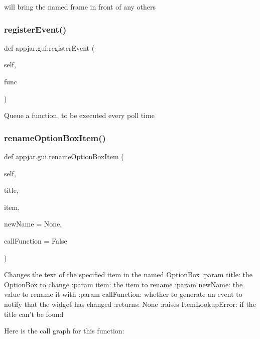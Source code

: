 \begin{DoxyVerb}
\begin{DoxyVerb}will bring the named frame in front of any others \end{DoxyVerb}
 \mbox{\label{classappjar_1_1gui_aaa7ebd8bcd4da761727153007b3b13f2}} 
\subsubsection{\texorpdfstring{register\+Event()}{registerEvent()}}
{\footnotesize\ttfamily def appjar.\+gui.\+register\+Event (\begin{DoxyParamCaption}\item[{}]{self,  }\item[{}]{func }\end{DoxyParamCaption})}

\begin{DoxyVerb}Queue a function, to be executed every poll time \end{DoxyVerb}
 \mbox{\label{classappjar_1_1gui_aa09c49e2dc870f5d9a27898b1076e5fc}} 
\subsubsection{\texorpdfstring{rename\+Option\+Box\+Item()}{renameOptionBoxItem()}}
{\footnotesize\ttfamily def appjar.\+gui.\+rename\+Option\+Box\+Item (\begin{DoxyParamCaption}\item[{}]{self,  }\item[{}]{title,  }\item[{}]{item,  }\item[{}]{new\+Name = {\ttfamily None},  }\item[{}]{call\+Function = {\ttfamily False} }\end{DoxyParamCaption})}

\begin{DoxyVerb}Changes the text of the specified item in the named OptionBox
:param title: the OptionBox to change
:param item: the item to rename
:param newName: the value to rename it with
:param callFunction: whether to generate an event to notify that the widget has changed
:returns: None
:raises ItemLookupError: if the title can't be found
\end{DoxyVerb}
 Here is the call graph for this function\+:
\mbox{\label{classappjar_1_1gui_a8c51df5e4d92a65cb11aaccb79674833}} 

\end{DoxyVerb}
